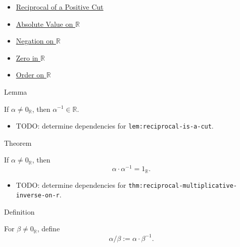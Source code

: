 \begin{dependencies}
\begin{itemize}
  \item \hyperref[def:reciprocal-positive-on-r]{Reciprocal of a Positive Cut}
  \item \hyperref[def:real-chapter-absolute-value-on-r]{Absolute Value on $\mathbb{R}$}
  \item \hyperref[def:negation-on-r]{Negation on $\mathbb{R}$}
  \item \hyperref[def:zero-in-r]{Zero in $\mathbb{R}$}
  \item \hyperref[def:order-on-r]{Order on $\mathbb{R}$}
\end{itemize}
\end{dependencies}

\begin{lemmabox}{Lemma}
\begin{lemma}
\label{lem:reciprocal-is-a-cut}
If $\alpha\ne0_{\mathbb{R}}$, then $\alpha^{-1}\in\mathbb{R}$.
\end{lemma}
\end{lemmabox}

\begin{dependencies}
\begin{itemize}
  \item TODO: determine dependencies for \texttt{lem:reciprocal-is-a-cut}.
\end{itemize}
\end{dependencies}

\begin{theorembox}{Theorem}
\begin{theorem}
\label{thm:reciprocal-multiplicative-inverse-on-r}
If $\alpha\ne0_{\mathbb{R}}$, then
\[
\alpha\cdot\alpha^{-1}=1_{\mathbb{R}}.
\]
\end{theorem}
\end{theorembox}

\begin{dependencies}
\begin{itemize}
  \item TODO: determine dependencies for \texttt{thm:reciprocal-multiplicative-inverse-on-r}.
\end{itemize}
\end{dependencies}

\begin{definitionbox}{Definition}
\begin{definition}
\label{def:division-on-r}
For $\beta\ne0_{\mathbb{R}}$, define
\[
\alpha/\beta:=\alpha\cdot\beta^{-1}.
\]
\end{definition}
\end{definitionbox}

